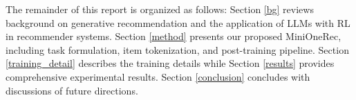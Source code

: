 The remainder of this report is organized as follows:
Section \ref{bg} reviews background on generative recommendation and the application of LLMs with RL in recommender systems.
Section \ref{method} presents our proposed MiniOneRec, including task formulation, item tokenization, and post-training pipeline.
Section \ref{training_detail} describes the training details while Section \ref{results} provides comprehensive experimental results.
Section \ref{conclusion} concludes with discussions of future directions.